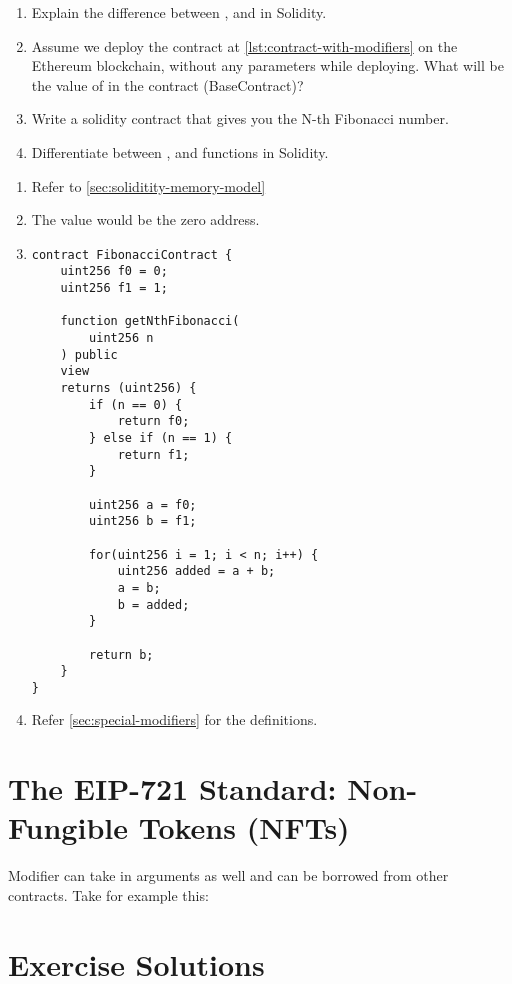 \begin{Exercise}[title={Solidity Basics}]
    \begin{enumerate}
        \item Explain the difference between ,  and  in Solidity.
        \item Assume we deploy the contract at \ref{lst:contract-with-modifiers} on the Ethereum blockchain, without any parameters while deploying. What will be the value of  in the contract (BaseContract)?
        \item Write a solidity contract that gives you the N-th Fibonacci number.
        \item Differentiate between ,  and  functions in Solidity.
    \end{enumerate}
\end{Exercise}
\begin{Answer}
    \begin{enumerate}
        \item Refer to \ref{sec:soliditity-memory-model}
        \item The value would be the zero address. 
        \item
            \begin{lstlisting}[language=Solidity, caption=Fibonacci Contract]
contract FibonacciContract {
    uint256 f0 = 0;
    uint256 f1 = 1;

    function getNthFibonacci(
        uint256 n
    ) public 
    view
    returns (uint256) {
        if (n == 0) {
            return f0;
        } else if (n == 1) {
            return f1;
        }

        uint256 a = f0;
        uint256 b = f1;

        for(uint256 i = 1; i < n; i++) {
            uint256 added = a + b;
            a = b;
            b = added;
        }

        return b;
    }
}
            \end{lstlisting}
        \item Refer \ref{sec:special-modifiers} for the definitions.
    \end{enumerate}
\end{Answer}



\section {The EIP-721 Standard: Non-Fungible Tokens (NFTs)}

Modifier can take in arguments as well and can be borrowed from other contracts. Take for example this:


\section{Exercise Solutions}
\shipoutAnswer
